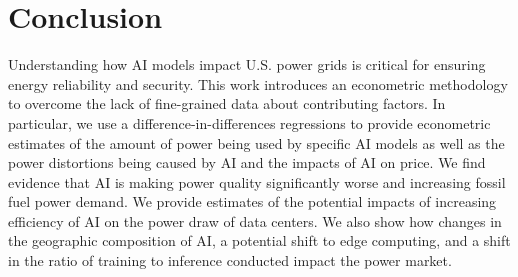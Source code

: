 \documentclass[sigconf]{acmart}
\begin{document}


\section{Conclusion}

Understanding how AI models impact U.S. power grids is critical for ensuring energy reliability and security. This work introduces an econometric methodology to overcome the lack of fine-grained data about contributing factors. In particular, we use a difference-in-differences regressions to provide econometric estimates of the amount of power being used by specific AI models as well as the power distortions being caused by AI and the impacts of AI on price. We find evidence that AI is making power quality significantly worse and increasing fossil fuel power demand. We provide estimates of the potential impacts of increasing efficiency of AI on the power draw of data centers. We also show how changes in the geographic composition of AI, a potential shift to edge computing, and a shift in the ratio of training to inference conducted impact the power market.
\end{document}
